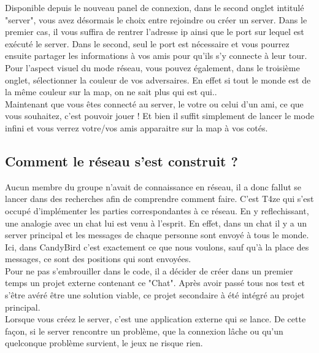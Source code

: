 \documentclass [11pt]{report}
\begin{document}
		Disponible depuis le nouveau panel de connexion, dans le second onglet intitulé "server", vous avez désormais le choix entre rejoindre ou créer un server. Dans le premier cas, il vous suffira de rentrer l'adresse ip ainsi que le port sur lequel est exécuté le server. Dans le second, seul le port est nécessaire et vous pourrez ensuite partager les informations à vos amis pour qu'ils s'y connecte à leur tour. Pour l'aspect visuel du mode réseau, vous pouvez également, dans le troisième onglet, sélectionner la couleur de vos adversaires. En effet si tout le monde est de la même couleur sur la map, on ne sait plus qui est qui..\\		
		
		Maintenant que vous êtes connecté au server, le votre ou celui d'un ami, ce que vous souhaitez,  c'est pouvoir jouer ! Et bien il suffit simplement de lancer le mode infini et vous verrez votre/vos amis apparaitre sur la map à vos cotés.\\		
				
		\vspace{10mm}
		
		
		\subsection{Comment le réseau s'est construit ?}
		
		Aucun membre du groupe n'avait de connaissance en réseau, il a donc fallut se lancer dans des recherches afin de comprendre comment faire. C'est T4ze qui s'est occupé d'implémenter les parties correspondantes à ce réseau. En y reflechissant, une analogie avec un chat lui est venu à l'esprit. En effet, dans un chat il y a un server principal et les messages de chaque personne sont envoyé à tous le monde. Ici, dans CandyBird c'est exactement ce que nous voulons, sauf qu'à la place des messages, ce sont des positions qui sont envoyées.\\
		
		Pour ne pas s'embrouiller dans le code, il a décider de créer dans un premier temps un projet externe contenant ce "Chat". Après avoir passé tous nos test et s'être avéré être une solution viable, ce projet secondaire à été intégré au projet principal.\\
		
		Lorsque vous créez le server, c'est une application externe qui se lance. De cette façon, si le server rencontre un problème, que la connexion lâche ou qu'un quelconque problème survient, le jeux ne risque rien. \\
				
\end{document}
